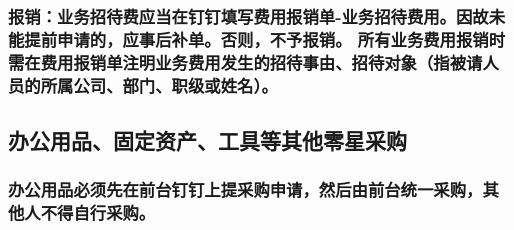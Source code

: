 \documentclass[16pt]{article}
\begin{document}
\subsubsection{报销：业务招待费应当在钉钉填写费用报销单-业务招待费用。因故未能提前申请的，应事后补单。否则，不予报销。
所有业务费用报销时需在费用报销单注明业务费用发生的招待事由、招待对象（指被请人员的所属公司、部门、职级或姓名）。}





\subsection{办公用品、固定资产、工具等其他零星采购}
\subsubsection{办公用品必须先在前台钉钉上提采购申请，然后由前台统一采购，其他人不得自行采购。}
\end{document}
